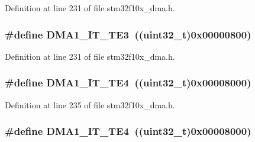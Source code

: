 Definition at line 231 of file stm32f10x\+\_\+dma.\+h.

\subsubsection[{\texorpdfstring{D\+M\+A1\+\_\+\+I\+T\+\_\+\+T\+E3}{DMA1_IT_TE3}}]{\setlength{\rightskip}{0pt plus 5cm}\#define D\+M\+A1\+\_\+\+I\+T\+\_\+\+T\+E3~(({\bf uint32\+\_\+t})0x00000800)}\hypertarget{group___d_m_a__interrupts__definition_ga54e8f93512a446fcaf2b10cd92f81379}{}\label{group___d_m_a__interrupts__definition_ga54e8f93512a446fcaf2b10cd92f81379}


Definition at line 231 of file stm32f10x\+\_\+dma.\+h.

\subsubsection[{\texorpdfstring{D\+M\+A1\+\_\+\+I\+T\+\_\+\+T\+E4}{DMA1_IT_TE4}}]{\setlength{\rightskip}{0pt plus 5cm}\#define D\+M\+A1\+\_\+\+I\+T\+\_\+\+T\+E4~(({\bf uint32\+\_\+t})0x00008000)}\hypertarget{group___d_m_a__interrupts__definition_ga48c3fecb70662a786f32d5cea0a894f8}{}\label{group___d_m_a__interrupts__definition_ga48c3fecb70662a786f32d5cea0a894f8}


Definition at line 235 of file stm32f10x\+\_\+dma.\+h.

\subsubsection[{\texorpdfstring{D\+M\+A1\+\_\+\+I\+T\+\_\+\+T\+E4}{DMA1_IT_TE4}}]{\setlength{\rightskip}{0pt plus 5cm}\#define D\+M\+A1\+\_\+\+I\+T\+\_\+\+T\+E4~(({\bf uint32\+\_\+t})0x00008000)}\hypertarget{group___d_m_a__interrupts__definition_ga48c3fecb70662a786f32d5cea0a894f8}{}\label{group___d_m_a__interrupts__definition_ga48c3fecb70662a786f32d5cea0a894f8}


